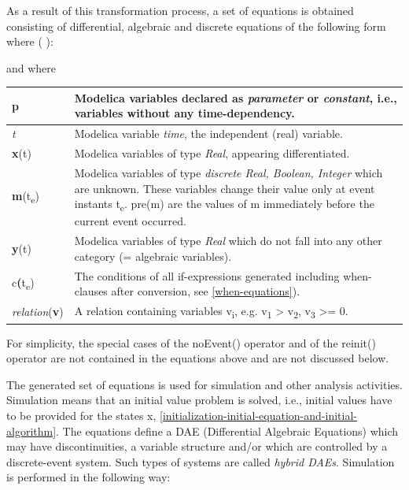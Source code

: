 \documentclass[10pt,a4paper]{report}
\begin{document}
As a result of this transformation process, a set of equations is
obtained consisting of differential, algebraic and discrete equations of
the following form where ( ):

and where

\begin{longtable}[]{@{}ll@{}}
\hline
\endhead
\textbf{p} & Modelica variables declared as \emph{parameter} or
\emph{constant}, i.e., variables without any
time-dependency.\\ \hline
\emph{t} & Modelica variable \emph{time}, the independent (real)
variable.\\ \hline
\textbf{x}(t) & Modelica variables of type \emph{Real}, appearing
differentiated.\\ \hline
\textbf{m}(t\textsubscript{e}) & Modelica variables of type
\emph{discrete Real, Boolean, Integer} which are unknown. These
variables change their value only at event instants t\textsubscript{e}.
pre(m) are the values of m immediately before the current event
occurred.\\ \hline
\textbf{y}(t) & Modelica variables of type \emph{Real} which do not fall
into any other category (= algebraic variables).\\ \hline
c\textbf{(}t\textsubscript{e}) & The conditions of all if-expressions
generated including when-clauses after conversion, see \ref{when-equations}).\\ \hline
\emph{relation}(\textbf{v}) & A relation containing variables
v\textsubscript{i}, e.g. v\textsubscript{1} \textgreater{}
v\textsubscript{2}, v\textsubscript{3} \textgreater{}= 0.\\ \hline

\end{longtable}

For simplicity, the special cases of the noEvent() operator and of the
reinit() operator are not contained in the equations above and are not
discussed below.

The generated set of equations is used for simulation and other analysis
activities. Simulation means that an initial value problem is solved,
i.e., initial values have to be provided for the states x, \ref{initialization-initial-equation-and-initial-algorithm}.
The equations define a DAE (Differential Algebraic Equations) which may
have discontinuities, a variable structure and/or which are controlled
by a discrete-event system. Such types of systems are called
\emph{hybrid DAEs}. Simulation is performed in the following way:
\end{document}
